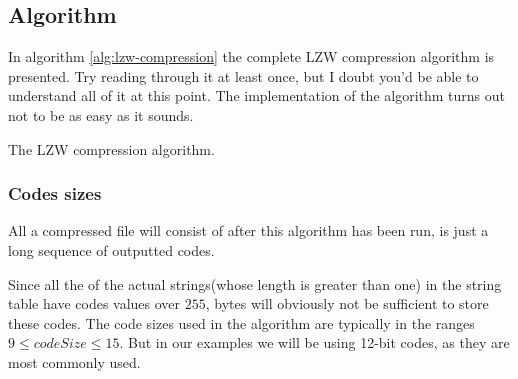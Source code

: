 \begin{refsection}
\subsection{Algorithm}
\label{sec:lzw-enc-algorithm}

In algorithm \ref{alg:lzw-compression} the complete LZW compression
algorithm is presented. Try reading through it at least once,
but I doubt you'd be able to understand all of it at this point. The
implementation of the algorithm turns out not to be as easy as it
sounds.

\begin{algorithm}[H]
  \caption{The LZW compression algorithm.}
  \label{alg:lzw-compression}
  \begin{algorithmic}[1]

    \While{\neof}

       \label{algl:hasingcheckintable}
         \label{algl:hasgetcode}
      \Else
        \State {}


          \State {}\label{algl:hashadd}

        \EndIf


      \EndIf


    \EndWhile

    \State {}
    \State {}

  \end{algorithmic}
\end{algorithm}

\subsubsection{Codes sizes}

All a \lzw compressed file will consist of after this algorithm has
been run, is just a long sequence of outputted codes.

Since all the of the actual strings(whose length is greater than one)
in the string table have codes values over $255$, bytes will obviously
not be sufficient to store these codes. The code sizes used in the \lzw algorithm are typically in the ranges $9 \leq
codeSize \leq 15$. But in our examples we will be using 12-bit codes,
as they are most commonly used.


\end{refsection}
